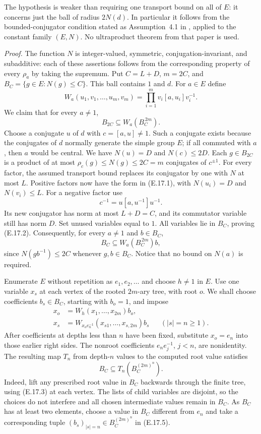 The hypothesis is weaker than requiring one transport bound on
all of $E$: it concerns just the ball of radius $2N(d)$.
In particular it follows from the bounded-conjugator condition
stated as Assumption~4.1 in
\cite{EGismatullinMajcherZiegler2024}, applied to the constant
family $(E,N)$. No ultraproduct theorem from that paper is used.

\emph{Proof.}
The function $N$ is integer-valued, symmetric, conjugation-invariant,
and subadditive: each of these assertions follows from the
corresponding property of every $\rho_a$ by taking the supremum.
Put $C=L+D$, $m=2C$, and
$B_C=\{g\in E:N(g)\leq C\}$. This ball contains $1$ and $d$.
For $a\in E$ define
\[
 W_a(u_1,v_1,\ldots,u_m,v_m)
       =\prod_{i=1}^{m}v_i[a,u_i]v_i^{-1}.
 \tag{E.17.1}
\]
We claim that for every $a\ne1$,
\[
             B_{2C}\subseteq W_a(B_C^{\,2m}).
 \tag{E.17.2}
\]
Choose a conjugate $u$ of $d$ with $c=[a,u]\ne1$.
Such a conjugate exists because the conjugates of $d$ normally
generate the simple group $E$; if all commuted with $a$, then
$a$ would be central. We have $N(u)=D$ and
$N(c)\leq2D$. Each $g\in B_{2C}$ is a product of at most
$\rho_c(g)\leq N(g)\leq2C=m$ conjugates of $c^{\pm1}$.
For every factor, the assumed transport bound replaces its
conjugator by one with $N$ at most $L$. Positive factors now
have the form in (E.17.1), with $N(u_i)=D$ and $N(v_i)\leq L$.
For a negative factor use
\[
                  c^{-1}=u[a,u^{-1}]u^{-1}.
\]
Its new conjugator has norm at most $L+D=C$, and its commutator
variable still has norm $D$. Set unused variables equal to $1$.
All variables lie in $B_C$, proving (E.17.2). Consequently,
for every $a\ne1$ and $b\in B_C$,
\[
                  B_C\subseteq W_a(B_C^{\,2m})b,
 \tag{E.17.3}
\]
since $N(gb^{-1})\leq2C$ whenever $g,b\in B_C$.
Notice that no bound on $N(a)$ is required.

Enumerate $E$ without repetition as $e_1,e_2,\ldots$ and
choose $h\ne1$ in $E$. Use one variable $x_s$ at each vertex
of the rooted $2m$-ary tree, with root $o$. We shall choose
coefficients $b_s\in B_C$, starting with $b_o=1$, and impose
\[
 \begin{aligned}
 x_o&=W_h(x_1,\ldots,x_{2m})b_o,\\
 x_s&=W_{x_oe_n^{-1}}(x_{s1},\ldots,x_{s,2m})b_s
            &&(|s|=n\geq1).
 \end{aligned}
 \tag{E.17.4}
\]
After coefficients at depths less than $n$ have been fixed,
substitute $x_o=e_n$ into those earlier right sides. The
nonroot coefficients $e_ne_j^{-1}$, $j<n$, are nonidentity.
The resulting map $T_n$ from depth-$n$ values to the computed
root value satisfies
\[
                  B_C\subseteq T_n(B_C^{(2m)^n}).
 \tag{E.17.5}
\]
Indeed, lift any prescribed root value in $B_C$ backwards
through the finite tree, using (E.17.3) at each vertex. The
lists of child variables are disjoint, so the choices do not
interfere and all chosen intermediate values remain in $B_C$.
As $B_C$ has at least two elements, choose a value in $B_C$
different from $e_n$ and take a corresponding tuple
$(b_s)_{|s|=n}\in B_C^{(2m)^n}$ in (E.17.5).

